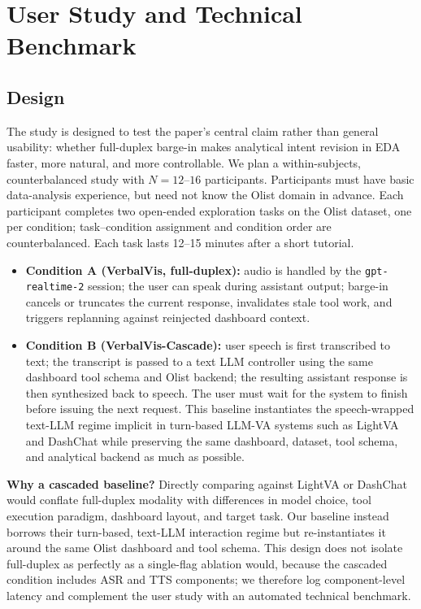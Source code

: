 \documentclass[journal]{IEEEtran}
\begin{document}
\section{User Study and Technical Benchmark}
\label{sec:study}

\subsection{Design}
The study is designed to test the paper's central claim rather than general usability: whether full-duplex barge-in makes analytical intent revision in EDA faster, more natural, and more controllable. We plan a within-subjects, counterbalanced study with $N{=}12$--$16$ participants. Participants must have basic data-analysis experience, but need not know the Olist domain in advance. Each participant completes two open-ended exploration tasks on the Olist dataset, one per condition; task--condition assignment and condition order are counterbalanced. Each task lasts 12--15 minutes after a short tutorial.

\begin{itemize}
\item \textbf{Condition A (VerbalVis, full-duplex):} audio is handled by the \texttt{gpt-realtime-2} session; the user can speak during assistant output; barge-in cancels or truncates the current response, invalidates stale tool work, and triggers replanning against reinjected dashboard context.
\item \textbf{Condition B (VerbalVis-Cascade):} user speech is first transcribed to text; the transcript is passed to a text LLM controller using the same dashboard tool schema and Olist backend; the resulting assistant response is then synthesized back to speech. The user must wait for the system to finish before issuing the next request. This baseline instantiates the speech-wrapped text-LLM regime implicit in turn-based LLM-VA systems such as LightVA and DashChat while preserving the same dashboard, dataset, tool schema, and analytical backend as much as possible.
\end{itemize}

\noindent\textbf{Why a cascaded baseline?}
Directly comparing against LightVA or DashChat would conflate full-duplex modality with differences in model choice, tool execution paradigm, dashboard layout, and target task. Our baseline instead borrows their turn-based, text-LLM interaction regime but re-instantiates it around the same Olist dashboard and tool schema. This design does not isolate full-duplex as perfectly as a single-flag ablation would, because the cascaded condition includes ASR and TTS components; we therefore log component-level latency and complement the user study with an automated technical benchmark.
\end{document}
